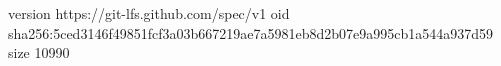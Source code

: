 version https://git-lfs.github.com/spec/v1
oid sha256:5ced3146f49851fcf3a03b667219ae7a5981eb8d2b07e9a995cb1a544a937d59
size 10990
